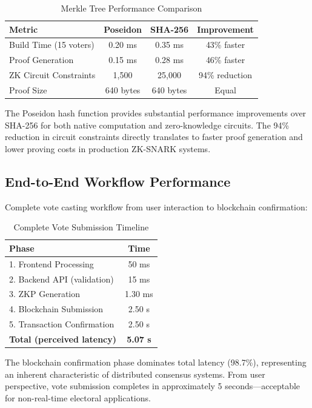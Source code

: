 \documentclass[conference]{IEEEtran}
\begin{document}
\begin{table}[H]
\caption{Merkle Tree Performance Comparison}
\centering
\footnotesize
\begin{tabular}{|l|c|c|c|}
\hline
\textbf{Metric} & \textbf{Poseidon} & \textbf{SHA-256} & \textbf{Improvement} \\
\hline
Build Time (15 voters) & 0.20 ms & 0.35 ms & 43\% faster \\
Proof Generation & 0.15 ms & 0.28 ms & 46\% faster \\
ZK Circuit Constraints & 1,500 & 25,000 & 94\% reduction \\
Proof Size & 640 bytes & 640 bytes & Equal \\
\hline
\end{tabular}
\label{tab:merkle_performance}
\end{table}

The Poseidon hash function provides substantial performance improvements over SHA-256 for both native computation and zero-knowledge circuits. The 94\% reduction in circuit constraints directly translates to faster proof generation and lower proving costs in production ZK-SNARK systems.

\subsection{End-to-End Workflow Performance}

Complete vote casting workflow from user interaction to blockchain confirmation:

\begin{table}[H]
\caption{Complete Vote Submission Timeline}
\centering
\begin{tabular}{|l|c|}
\hline
\textbf{Phase} & \textbf{Time} \\
\hline
1. Frontend Processing & 50 ms \\
2. Backend API (validation) & 15 ms \\
3. ZKP Generation & 1.30 ms \\
4. Blockchain Submission & 2.50 s \\
5. Transaction Confirmation & 2.50 s \\
\hline
\textbf{Total (perceived latency)} & \textbf{5.07 s} \\
\hline
\end{tabular}
\label{tab:endtoend_performance}
\end{table}

The blockchain confirmation phase dominates total latency (98.7\%), representing an inherent characteristic of distributed consensus systems. From user perspective, vote submission completes in approximately 5 seconds---acceptable for non-real-time electoral applications.
\end{document}
